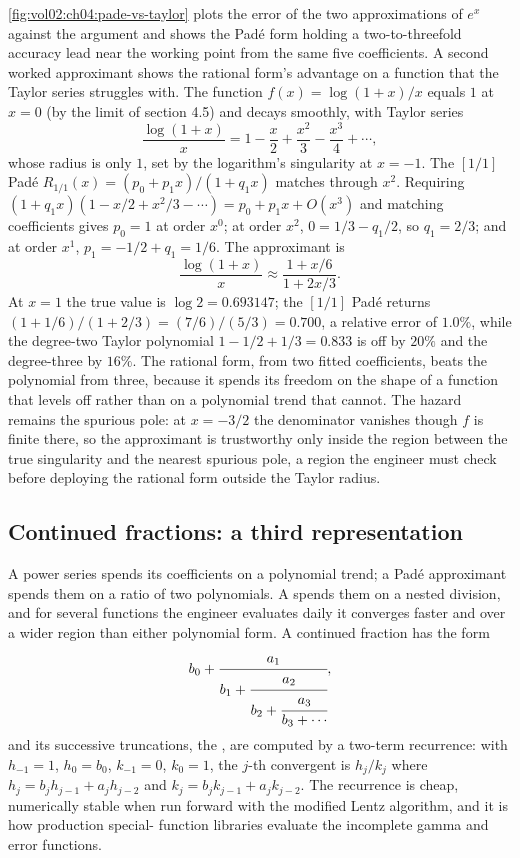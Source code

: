 

\autoref{fig:vol02:ch04:pade-vs-taylor} plots the error of the two
approximations of $e^{x}$ against the argument and shows the Pad\'e form
holding a two-to-threefold accuracy lead near the working point from the
same five coefficients. A second worked approximant shows the rational
form's advantage on a function that the Taylor series struggles with. The
function $f(x) = \log(1 + x)/x$ equals $1$ at $x = 0$ (by the limit of
section 4.5) and decays smoothly, with Taylor series
\[
\frac{\log(1 + x)}{x} = 1 - \frac{x}{2} + \frac{x^{2}}{3} -
\frac{x^{3}}{4} + \cdots,
\]
whose radius is only $1$, set by the logarithm's singularity at
$x = -1$. The $[1/1]$ Pad\'e $R_{1/1}(x) = (p_{0} + p_{1} x)/(1 + q_{1}
x)$ matches through $x^{2}$. Requiring $(1 + q_{1} x)(1 - x/2 + x^{2}/3 -
\cdots) = p_{0} + p_{1} x + O(x^{3})$ and matching coefficients gives
$p_{0} = 1$ at order $x^{0}$; at order $x^{2}$, $0 = 1/3 - q_{1}/2$, so
$q_{1} = 2/3$; and at order $x^{1}$, $p_{1} = -1/2 + q_{1} = 1/6$. The
approximant is
\[
\frac{\log(1 + x)}{x} \approx \frac{1 + x/6}{1 + 2x/3}.
\]
At $x = 1$ the true value is $\log 2 = 0.693147$; the $[1/1]$ Pad\'e
returns $(1 + 1/6)/(1 + 2/3) = (7/6)/(5/3) = 0.700$, a relative error of
$1.0\%$, while the degree-two Taylor polynomial $1 - 1/2 + 1/3 = 0.833$
is off by $20\%$ and the degree-three by $16\%$. The rational form, from
two fitted coefficients, beats the polynomial from three, because it
spends its freedom on the shape of a function that levels off rather than
on a polynomial trend that cannot. The hazard remains the spurious pole:
at $x = -3/2$ the denominator vanishes though $f$ is finite there, so the
approximant is trustworthy only inside the region between the true
singularity and the nearest spurious pole, a region the engineer must
check before deploying the rational form outside the Taylor radius.

\subsection{Continued fractions: a third representation}

A power series spends its coefficients on a polynomial trend; a Pad\'{e}
approximant spends them on a ratio of two polynomials. A
 spends them on a nested division, and for
several functions the engineer evaluates daily it converges faster and
over a wider region than either polynomial form. A continued fraction
has the form
\[
b_{0} + \cfrac{a_{1}}{b_{1} + \cfrac{a_{2}}{b_{2} + \cfrac{a_{3}}{b_{3}
+ \cdots}}},
\]
and its successive truncations, the , are computed
by a two-term recurrence: with $h_{-1} = 1$, $h_{0} = b_{0}$, $k_{-1} =
0$, $k_{0} = 1$, the $j$-th convergent is $h_{j}/k_{j}$ where $h_{j} =
b_{j} h_{j-1} + a_{j} h_{j-2}$ and $k_{j} = b_{j} k_{j-1} + a_{j}
k_{j-2}$. The recurrence is cheap, numerically stable when run forward
with the modified Lentz algorithm, and it is how production special-
function libraries evaluate the incomplete gamma and error functions.

